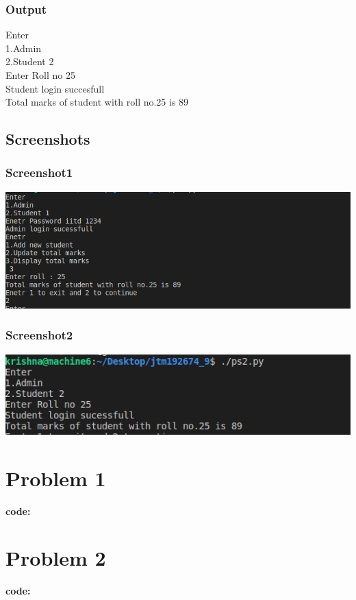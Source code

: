 \documentclass[12pt]{article}
\begin{document}
\subsubsection{Output}
Enter\\
1.Admin\\
2.Student 2\\
Enter Roll no 25\\
Student login succesfull\\
Total marks of student with roll no.25 is 89\\
\subsection{Screenshots}
\subsubsection{Screenshot1}
\includegraphics[width=\linewidth]{lab9_1.png}
\clearpage
\subsubsection{Screenshot2}
\includegraphics[width=\linewidth]{lab9_3.png}
\newpage
 \appendix
   \appendixpage
   \addappheadtotoc
  \section*{Problem 1}
  {\large \textbf{code:}}
  
  \section*{Problem 2}
  {\large \textbf{code:}}
  
  
\end{document}
